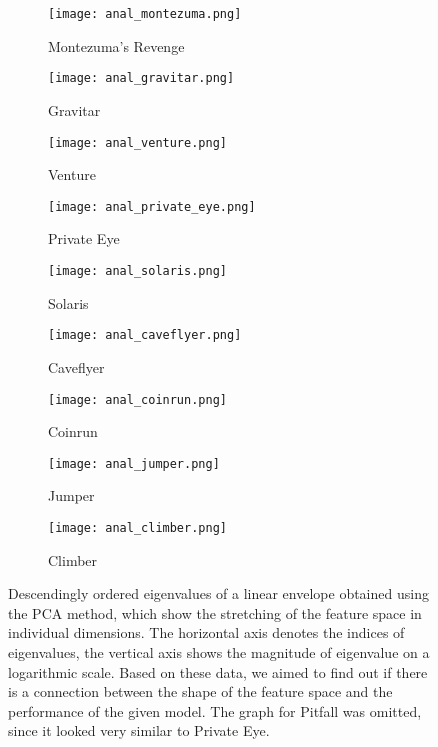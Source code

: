 \documentclass[a4paper,11pt]{elsarticle}
\begin{document}
\begin{figure}[t!]
  \centering
  \begin{subfigure}[b]{0.3\textwidth}
    \centering
    \texttt{[image: anal\_montezuma.png]}
    \caption{Montezuma's Revenge}
    \label{fig:eigen2a}
  \end{subfigure}
  \begin{subfigure}[b]{0.3\textwidth}
    \centering
    \texttt{[image: anal\_gravitar.png]}
    \caption{Gravitar}
    \label{fig:eigen2b}
  \end{subfigure}  
  \begin{subfigure}[b]{0.3\textwidth}
    \centering
    \texttt{[image: anal\_venture.png]}
    \caption{Venture}
    \label{fig:eigen2c}
  \end{subfigure}
  \begin{subfigure}[b]{0.3\textwidth}
    \centering
    \texttt{[image: anal\_private\_eye.png]}
    \caption{Private Eye}
    \label{fig:eigen2d}
  \end{subfigure} 
  \begin{subfigure}[b]{0.3\textwidth}
    \centering
    \texttt{[image: anal\_solaris.png]}
    \caption{Solaris}
    \label{fig:eigen2e}   
  \end{subfigure}
    \begin{subfigure}[b]{0.3\textwidth}
    \centering
    \texttt{[image: anal\_caveflyer.png]}
    \caption{Caveflyer}
    \label{fig:eigen2f}
  \end{subfigure}
  \begin{subfigure}[b]{0.3\textwidth}
    \centering
    \texttt{[image: anal\_coinrun.png]}
    \caption{Coinrun}
    \label{fig:eigen2g}
  \end{subfigure}
  \begin{subfigure}[b]{0.3\textwidth}
    \centering
    \texttt{[image: anal\_jumper.png]}
    \caption{Jumper}
    \label{fig:eigen2h}
  \end{subfigure}
    \begin{subfigure}[b]{0.3\textwidth}
    \centering
    \texttt{[image: anal\_climber.png]}
    \caption{Climber}
    \label{fig:eigen2i}
  \end{subfigure}
\caption{Descendingly ordered eigenvalues of a linear envelope obtained using the PCA method, which show the stretching of the feature space in individual dimensions. 
The horizontal axis denotes the indices of eigenvalues, the vertical axis shows the magnitude of eigenvalue on a logarithmic scale.
Based on these data, we aimed to find out if there is a connection between the shape of the feature space and the performance of the given model. The graph for Pitfall was omitted, since it looked very similar to Private Eye. }
\label{fig:cnd_eigen}
\end{figure}
\end{document}
